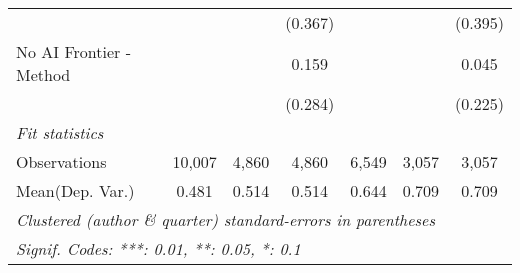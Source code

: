 \begin{tabular}{lcccccc}
                           &               &              & (0.367)      &               &               & (0.395)\\   
   No AI Frontier - Method &               &              & 0.159        &               &               & 0.045\\   
                           &               &              & (0.284)      &               &               & (0.225)\\   
   \midrule
   \emph{Fit statistics}\\
   Observations            & 10,007        & 4,860        & 4,860        & 6,549         & 3,057         & 3,057\\  
Mean(Dep. Var.) & 0.481 & 0.514 & 0.514 & 0.644 & 0.709 & 0.709 \\
   \midrule \midrule
   \multicolumn{7}{l}{\emph{Clustered (author \& quarter) standard-errors in parentheses}}\\
   \multicolumn{7}{l}{\emph{Signif. Codes: ***: 0.01, **: 0.05, *: 0.1}}\\
\end{tabular}
\par\endgroup
